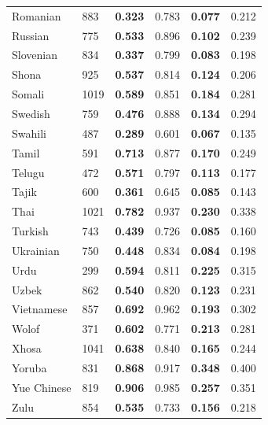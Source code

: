 \begin{longtable}{lp{0.8cm}cccc}
Romanian & 883 & \textbf{0.323} & 0.783 & \textbf{0.077} & 0.212 \\
Russian & 775 & \textbf{0.533} & 0.896 & \textbf{0.102} & 0.239 \\
Slovenian & 834 & \textbf{0.337} & 0.799 & \textbf{0.083} & 0.198 \\
Shona & 925 & \textbf{0.537} & 0.814 & \textbf{0.124} & 0.206 \\
Somali & 1019 & \textbf{0.589} & 0.851 & \textbf{0.184} & 0.281 \\
Swedish & 759 & \textbf{0.476} & 0.888 & \textbf{0.134} & 0.294 \\
Swahili & 487 & \textbf{0.289} & 0.601 & \textbf{0.067} & 0.135 \\
Tamil & 591 & \textbf{0.713} & 0.877 & \textbf{0.170} & 0.249 \\
Telugu & 472 & \textbf{0.571} & 0.797 & \textbf{0.113} & 0.177 \\
Tajik & 600 & \textbf{0.361} & 0.645 & \textbf{0.085} & 0.143 \\
Thai & 1021 & \textbf{0.782} & 0.937 & \textbf{0.230} & 0.338 \\
Turkish & 743 & \textbf{0.439} & 0.726 & \textbf{0.085} & 0.160 \\
Ukrainian & 750 & \textbf{0.448} & 0.834 & \textbf{0.084} & 0.198 \\
Urdu & 299 & \textbf{0.594} & 0.811 & \textbf{0.225} & 0.315 \\
Uzbek & 862 & \textbf{0.540} & 0.820 & \textbf{0.123} & 0.231 \\
Vietnamese & 857 & \textbf{0.692} & 0.962 & \textbf{0.193} & 0.302 \\
Wolof & 371 & \textbf{0.602} & 0.771 & \textbf{0.213} & 0.281 \\
Xhosa & 1041 & \textbf{0.638} & 0.840 & \textbf{0.165} & 0.244 \\
Yoruba & 831 & \textbf{0.868} & 0.917 & \textbf{0.348} & 0.400 \\
Yue Chinese & 819 & \textbf{0.906} & 0.985 & \textbf{0.257} & 0.351 \\
Zulu & 854 & \textbf{0.535} & 0.733 & \textbf{0.156} & 0.218 \\
\end{longtable}
\endgroup